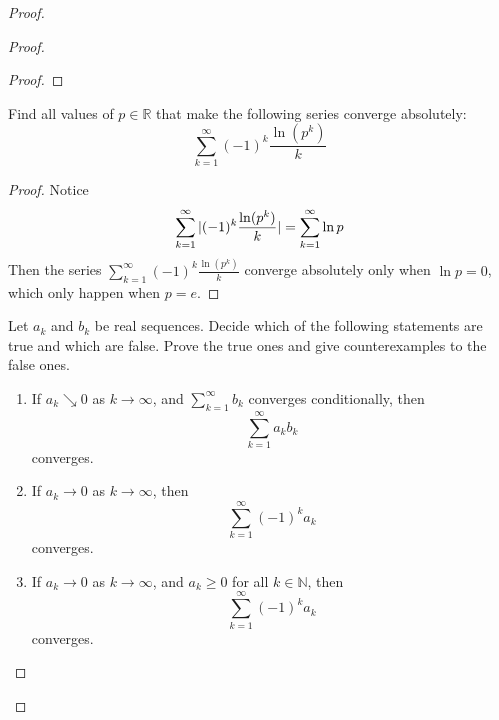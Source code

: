 \documentclass{report}
\begin{document}
\begin{proof}
\begin{proof}
\begin{proof}
\end{proof}

\begin{question}{}{}
Find all values of \( p \in \mathbb{R} \) that make the following series converge absolutely:
\[
\sum_{k=1}^{\infty} (-1)^k \frac{\ln(p^k)}{k}
\]
\end{question}
\begin{proof}
Notice 
\begin{equation}
  \sum_{k=1}^\infty |(-1)^k \frac{\ln (p^k)}{k}|=\sum_{k=1}^\infty \ln p
\end{equation}
Then the series $\sum_{k=1}^\infty (-1)^k \frac{\ln (p^k)}{k}$ converge absolutely only when $\ln p=0$, which only happen when $p=e$. 
\end{proof}

\begin{question}{}{}
Let \( a_k \) and \( b_k \) be real sequences. Decide which of the following statements are true and which are false. Prove the true ones and give counterexamples to the false ones.

\begin{enumerate}
    \item If \( a_k \searrow 0 \) as \( k \to \infty \), and  $\sum_{k=1}^{\infty} b_k$ converges conditionally, then 
    \[
    \sum_{k=1}^{\infty} a_kb_k
    \]
    converges.
    
    \item If \( a_k \to 0 \) as \( k \to \infty \), then 
    \[
    \sum_{k=1}^{\infty} (-1)^k a_k
    \]
    converges.
    
    \item If \( a_k \to 0 \) as \( k \to \infty \), and \( a_k \geq 0 \) for all \( k \in \mathbb{N} \), then 
    \[
    \sum_{k=1}^{\infty} (-1)^k a_k
    \]
    converges.
    

\end{enumerate}
\end{question}
\end{proof}
\end{proof}
\end{document}
